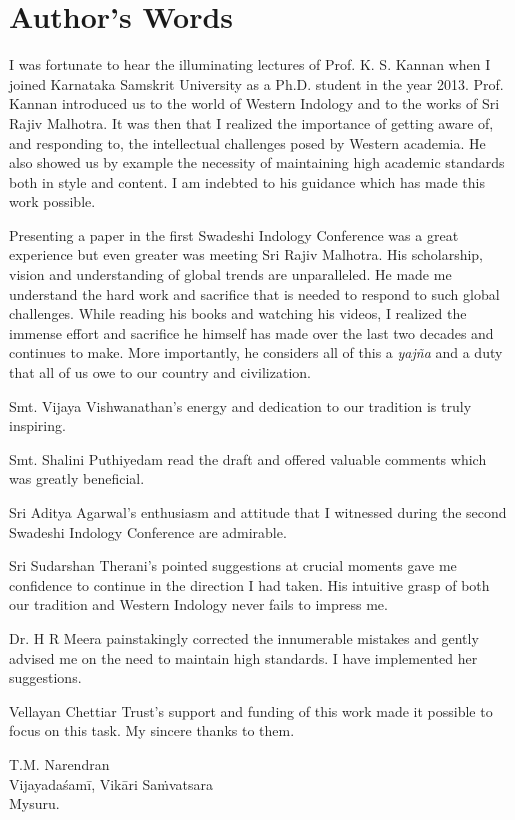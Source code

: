 
\chapter*{Author’s Words}\label{authorswords}

I was fortunate to hear the illuminating lectures of Prof. K. S. Kannan when I joined Karnataka Samskrit University as a Ph.D. student in the year 2013. Prof. Kannan introduced us to the world of Western Indology and to the works of Sri Rajiv Malhotra. It was then that I realized the importance of getting aware of, and responding to, the intellectual challenges posed by Western academia. He also showed us by example the necessity of maintaining high academic standards both in style and content. I am indebted to his guidance which has made this work possible.

Presenting a paper in the first Swadeshi Indology Conference was a great experience but even greater was meeting Sri Rajiv Malhotra. His scholarship, vision and understanding of global trends are unparalleled. He made me understand the hard work and sacrifice that is needed to respond to such global challenges. While reading his books and watching his videos, I realized the immense effort and sacrifice he himself has made over the last two decades and continues to make. More importantly, he considers all of this a \textit{yajña} and a duty that all of us owe to our country and civilization.

Smt. Vijaya Vishwanathan’s energy and dedication to our tradition is truly inspiring.

Smt. Shalini Puthiyedam read the draft and offered valuable comments which was greatly beneficial.

Sri Aditya Agarwal’s enthusiasm and attitude that I witnessed during the second Swadeshi Indology Conference are admirable.

Sri Sudarshan Therani’s pointed suggestions at crucial moments gave me confidence to continue in the direction I had taken. His intuitive grasp of both our tradition and Western Indology never fails to impress me.

Dr. H R Meera painstakingly corrected the innumerable mistakes and gently advised me on the need to maintain high standards. I have implemented her suggestions.

Vellayan Chettiar Trust’s support and funding of this work made it possible to focus on this task. My sincere thanks to them.

\begin{flushright}
T.M. Narendran\\ Vijayadaśamī, Vikāri Saṁvatsara\\ Mysuru.
\end{flushright}

